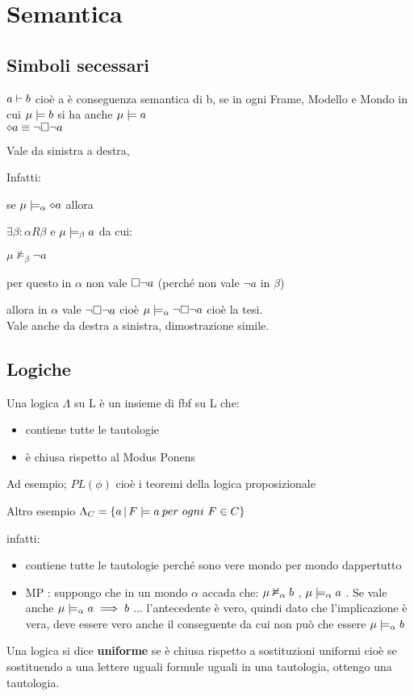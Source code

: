 
\chapter{Semantica}


\section{Simboli secessari}

$a\vdash b$ cioè a è conseguenza semantica di b, se in ogni Frame,
Modello e Mondo in cui $\mu\models b$ si ha anche $\mu\models a$\\


$\diamond a\equiv\neg\square\neg a$

Vale da sinistra a destra,

Infatti:

se $\mu\models_{\alpha}\diamond a$ allora

$\exists\beta:$$\alpha R\beta$ e $\mu\models_{\beta}a$ da cui:

$\mu\nvDash_{\beta}\neg a$

per questo in $\alpha$ non vale $\square\neg a$ (perché non vale
$\neg a$ in $\beta$)

allora in $\alpha$ vale $\neg\square\neg a$ cioè $\mu\models_{\alpha}\neg\square\neg a$
cioè la tesi. \\


Vale anche da destra a sinistra, dimostrazione simile. \\



\section{Logiche}

Una logica $\Lambda$ su L è un insieme di fbf su L che: 
\begin{itemize}
\item contiene tutte le tautologie 
\item è chiusa rispetto al Modus Ponens 
\end{itemize}
Ad esempio; $PL(\phi)$ cioè i teoremi della logica proposizionale

Altro esempio $\Lambda_{C}=\{a\,|\,F\models a\: per\ ogni\ F\in C\}$

infatti: 
\begin{itemize}
\item contiene tutte le tautologie perché sono vere mondo per mondo dappertutto 
\item MP : suppongo che in un mondo $\alpha$ accada che: $\mu\nvDash_{\alpha}b$
, $\mu\models_{\alpha}a$ . Se vale anche $\mu\models_{\alpha}a\implies b$
... l'antecedente è vero, quindi dato che l'implicazione è vera, deve
essere vero anche il conseguente da cui non può che essere $\mu\models_{\alpha}b$ 
\end{itemize}
Una logica si dice \textbf{uniforme }se è chiusa rispetto a sostituzioni
uniformi cioè se sostituendo a una lettere uguali formule uguali in
una tautologia, ottengo una tautologia.

